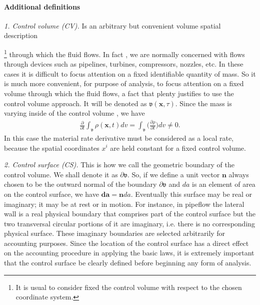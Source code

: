 \documentclass[12pt]{article}
\begin{document}
\paragraph{Additional definitions}
{\em 1. Control volume (CV).} Is an arbitrary but convenient volume spatial description {\footnote{It is usual to consider fixed the control volume with respect to the chosen coordinate system.} through which the fluid flows. In fact , we are normally concerned with flows through devices such as pipelines, turbines, compressors, nozzles, etc. In these cases it is difficult to focus attention on a fixed identifiable quantity of mass. So it is much more convenient, for purpose of analysis, to focus attention on a fixed volume through which the fluid flows, a fact that plenty justifies to use the control volume approach. It will be denoted as $\mathfrak{v}(\mathbf{x},\tau)$. Since the mass is varying inside of the control volume , we have
\begin{align*}
\frac{\partial}{\partial{t}}\int_{\mathfrak{v}}\rho(\mathbf{x},t)dv=
\int_{\mathfrak{v}}\Big(\frac{\partial\rho}{\partial{t}}\Big)dv\neq{0}.
\end{align*}
In this case the material rate derivative must be considered as a local rate, because the spatial coordinates $x^i$ are held constant for a fixed control volume.

{\em 2. Control surface (CS).} This is how we call the geometric boundary of the control volume. We shall denote it as $\partial\mathfrak{v}.$ So, if we define a unit vector $\mathbf{n}$ always chosen to be the outward normal of the boundary $\partial\mathfrak{v}$ and $da$ is an element of area on the control surface, we have $\mathbf{da}=\mathbf{n}da$. Eventually this surface may be real or imaginary; it may be at rest or in motion. For instance, in pipeflow the lateral wall is a real physical boundary that comprises part of the control surface but the two transversal circular portions of it are imaginary, i.e. there is no corresponding physical surface. These imaginary boundaries are selected arbitrarily for accounting purposes. Since the location of the control surface has a direct effect on the accounting procedure in applying the basic laws, it is extremely important that the control surface be clearly defined before beginning any form of analysis. 
  

}
\end{document}
